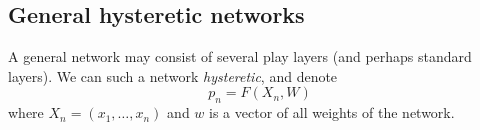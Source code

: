 \subsection{General hysteretic networks\label{sec:chapter3:general-hysteretic-networks}}
A general network may consist of several play layers (and perhaps standard layers). We can such a network \textsl{hysteretic}, and denote
\begin{equation*}
  p_n = F(X_n, W)
\end{equation*}
where $X_n = (x_1, \ldots, x_n)$ and $w$ is a vector of all weights of the network.
